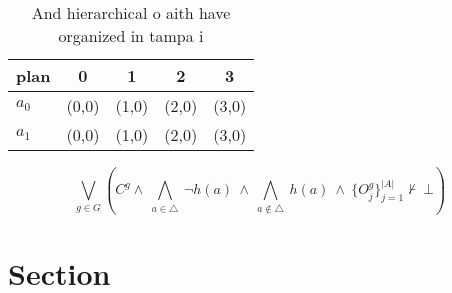 \documentclass[a4paper]{article}
\begin{document}
\begin{table}
\begin{adjustbox}{width=0.7\columnwidth}
\begin{tabular}{|l|l|l|l|l|}
\hline
\textbf{plan} & \multicolumn{1}{c|}{\textbf{0}} & \multicolumn{1}{c|}{\textbf{1}} & \multicolumn{1}{c|}{\textbf{2}} & \multicolumn{1}{c|}{\textbf{3}} \\ \hline
\textbf{$a_0$}  & (0,0) & (1,0) & (2,0) & (3,0) \\ \hline
\textbf{$a_1$}  & (0,0) & (1,0) & (2,0) & (3,0) \\ \hline
\end{tabular}
\end{adjustbox}
\caption{And hierarchical o aith have organized in tampa i
}
\end{table}

\[\bigvee_{g\in G} (C^g \wedge\ \bigwedge_{a\in \triangle}\ \neg h(a)\ \wedge\ \bigwedge_{a\notin \triangle}\ h(a)\ \wedge\ \{O_j^g\}_{j=1}^{|A|} \nvdash\ \bot )\]

\section{Section}
\end{document}
